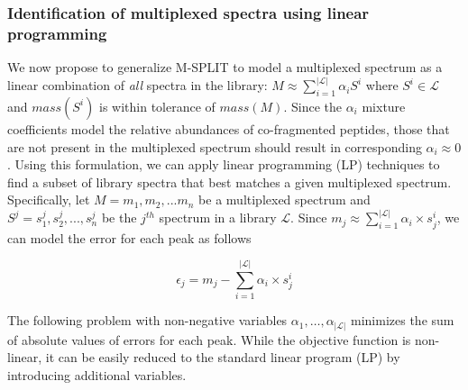 \documentclass[arial,11pt]{article}
\begin{document}
\subsubsection{Identification of multiplexed spectra using linear programming}


We now propose to generalize M-SPLIT  to model a multiplexed spectrum as a linear combination of \emph{all} spectra in the library: $M \approx \sum_{i=1}^{|\mathcal{L}|}{\alpha_{i}S^{i}}$ where $S^{i}\in \mathcal{L}$ and $mass(S^i)$ is within tolerance of $mass(M)$.  Since the $\alpha_i$ mixture coefficients model the relative abundances of co-fragmented peptides, those that are not present in the multiplexed spectrum should result in corresponding $\alpha_i\approx 0$. Using this formulation, we can apply linear programming (LP) techniques to find a subset of
library spectra that best matches a given multiplexed spectrum. Specifically, let $M = m_{1}, m_{2}, ... m_{n}$ be a multiplexed spectrum and $S^{j} = {s^{j}_{1}, s^{j}_{2}, ..., s^{j}_{n}}$ be the $j^{th}$
spectrum in a library $\mathcal{L}$.
Since $m_j \approx \sum_{i=1}^{|\mathcal{L}|}  \alpha_i \times {s^{i}_j}$, we can model the error for each peak as follows

\[
\epsilon_j = m_j - \sum_{i=1}^{|\mathcal{L}|} \alpha_i \times{s^{i}_j}
\]

The following problem with non-negative variables $\alpha_1, \ldots , \alpha_{|\mathcal{L}|}$
 minimizes the sum of absolute values of errors for each peak. While the objective function is non-linear, it can be easily reduced to the standard linear program (LP) by introducing additional variables.
\end{document}
